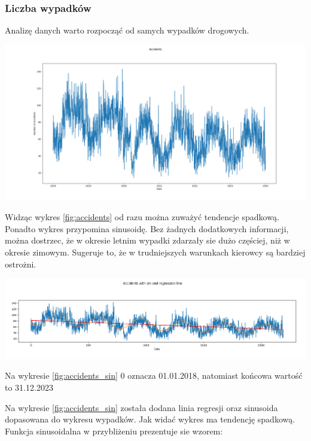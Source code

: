 \documentclass{article}
\begin{document}
\subsubsection{Liczba wypadków}
Analizę danych warto rozpocząć od samych wypadków drogowych.

\begin{center}
    \includegraphics[width=\textwidth]{visualization/accidents.png}
    \captionsetup{hypcap=false}
    \label{fig:accidents}
\end{center}

Widząc wykres \ref{fig:accidents} od razu można zuważyć tendencje spadkową. Ponadto wykres przypomina sinusoidę. Bez żadnych dodatkowych informacji, można dostrzec, że w okresie letnim wypadki zdarzały sie dużo częściej, niż w okresie zimowym. Sugeruje to, że w trudniejszych warunkach kierowcy są bardziej ostrożni.

\begin{center}
    \includegraphics[width=\textwidth]{visualization/accidents_sin.png}
    \captionsetup{hypcap=false}
    \label{fig:accidents_sin}
\end{center}
Na wykresie \ref{fig:accidents_sin} 0 oznacza 01.01.2018, natomiast końcowa wartość to 31.12.2023

Na wykresie \ref{fig:accidents_sin} została dodana linia regresji oraz sinusoida dopasowana do wykresu wypadków. Jak widać wykres ma tendencję spadkową. Funkcja sinusoidalna w przybliżeniu prezentuje sie wzorem:
\end{document}
